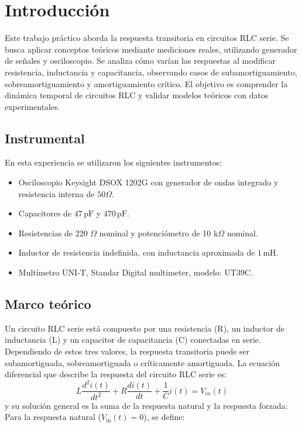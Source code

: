 \documentclass{article}
\begin{document}
\newpage

\tableofcontents %

\newpage

\section{Introducción}
    Este trabajo práctico aborda la respuesta transitoria
     en circuitos RLC serie. Se busca aplicar conceptos 
     teóricos mediante mediciones reales, utilizando generador 
     de señales y osciloscopio. Se analiza cómo varían las
      respuestas al modificar resistencia, inductancia y 
      capacitancia, observando casos de subamortiguamiento,
       sobreamortiguamiento y amortiguamiento crítico. 
       El objetivo es comprender la dinámica temporal 
       de circuitos RLC y validar modelos teóricos
       con datos experimentales.
    \subsection{Instrumental}
        En esta experiencia se utilizaron los siguientes instrumentos:
\begin{itemize}
  \item Osciloscopio Keysight DSOX 1202G con generador de ondas integrado y resistencia interna de $50 \Omega$.
  \item Capacitores de $47\,\text{pF}$ y $470\,\text{pF}$.
  \item Resistencias de 220 $\Omega$ nominal y potenciómetro de 10 k$\Omega$ nominal.
  \item Inductor de resistencia indefinida, con inductancia aproximada de $1\,\text{mH}$.
  \item Multímetro UNI-T,  Standar Digital multimeter, modelo: UT39C.
\end{itemize}

\subsection{Marco teórico}

    Un circuito RLC serie está compuesto por una resistencia (R), un inductor de inductancia (L) y un capacitor de
    capacitancia (C) conectadas en serie. Dependiendo de estos tres valores, la respuesta transitoria
    puede ser subamortiguada, sobreamortiguada o críticamente 
    amortiguada. La ecuación diferencial que describe la 
    respuesta del circuito RLC serie es:
    \begin{equation}
        L\frac{d^2i(t)}{dt^2} + R\frac{di(t)}{dt} + \frac{1}{C}i(t) = V_{in}(t)
    \end{equation}
    y su solución general es la suma de la respuesta natural y la respuesta forzada:
Para la respuesta natural (\( V_{\text{in}}(t) = 0 \)), se define:
\end{document}
